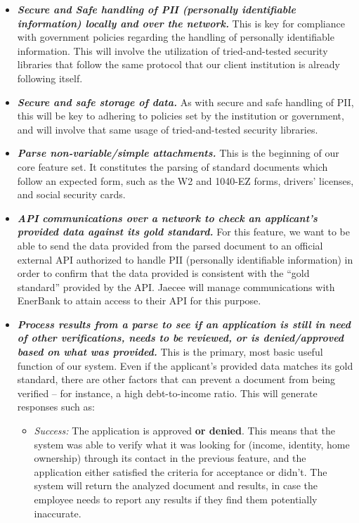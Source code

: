 \begin{itemize}[labelindent=0pt, wide]
    \item \textbf{\textit{Secure and Safe handling of PII (personally identifiable information) locally and over the network.}} This is key for compliance with government policies regarding the handling of personally identifiable information. This will involve the utilization of tried-and-tested security libraries that follow the same protocol that our client institution is already following itself.
    
    \item \textbf{\textit{Secure and safe storage of data.}} As with secure and safe handling of PII, this will be key to adhering to policies set by the institution or government, and will involve that same usage of tried-and-tested security libraries.
    
    \item \textbf{\textit{Parse non-variable/simple attachments.}} This is the beginning of our core feature set. It constitutes the parsing of standard documents which follow an expected form, such as the W2 and 1040-EZ forms, drivers' licenses, and social security cards.
    
    \item \textbf{\textit{API communications over a network to check an applicant's provided data against its gold standard.}} For this feature, we want to be able to send the data provided from the parsed document to an official external API authorized to handle PII (personally identifiable information) in order to confirm that the data provided is consistent with the ``gold standard'' provided by the API. Jaecee will manage communications with EnerBank to attain access to their API for this purpose.
    
    \item \textbf{\textit{Process results from a parse to see if an application is still in need of other verifications, needs to be reviewed, or is denied/approved based on what was provided.}} This is the primary, most basic useful function of our system. Even if the applicant's provided data matches its gold standard, there are other factors that can prevent a document from being verified -- for instance, a high debt-to-income ratio. This will generate responses such as:
    
    \begin{itemize}
        \item \textit{Success:} The application is approved \textbf{or denied}. This means that the system was able to verify what it was looking for (income, identity, home ownership) through its contact in the previous feature, and the application either satisfied the criteria for acceptance or didn't. The system will return the analyzed document and results, in case the employee needs to report any results if they find them potentially inaccurate.
        

\end{itemize}
\end{itemize}
